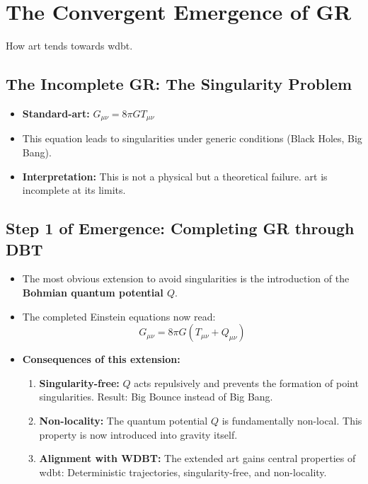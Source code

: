 \chapter{The Convergent Emergence of GR}
 How \gls{art} tends towards \gls{wdbt}.

\section{The Incomplete GR: The Singularity Problem}

\begin{itemize}
    \item \textbf{Standard-\gls{art}:} $G_{\mu\nu} = 8\pi G T_{\mu\nu}$
    \item This equation leads to singularities under generic conditions (Black Holes, Big Bang).
    \item \textbf{Interpretation:} This is not a physical but a theoretical failure. \gls{art} is incomplete at its limits.
\end{itemize}

\section{Step 1 of Emergence: Completing GR through DBT}

\begin{itemize}
    \item The most obvious extension to avoid singularities is the introduction of the \textbf{Bohmian quantum potential $Q$}.
    \item The completed Einstein equations now read:
    \begin{equation}
        G_{\mu\nu} = 8\pi G (T_{\mu\nu} + Q_{\mu\nu})
    \end{equation}
    \item \textbf{Consequences of this extension:}
    \begin{enumerate}
        \item \textbf{Singularity-free:} $Q$ acts repulsively and prevents the formation of point singularities. Result: Big Bounce instead of Big Bang.
        \item \textbf{Non-locality:} The quantum potential $Q$ is fundamentally non-local. This property is now introduced into gravity itself.
        \item \textbf{Alignment with WDBT:} The extended \gls{art} gains central properties of \gls{wdbt}: Deterministic trajectories, singularity-free, and non-locality.
    \end{enumerate}
\end{itemize}

